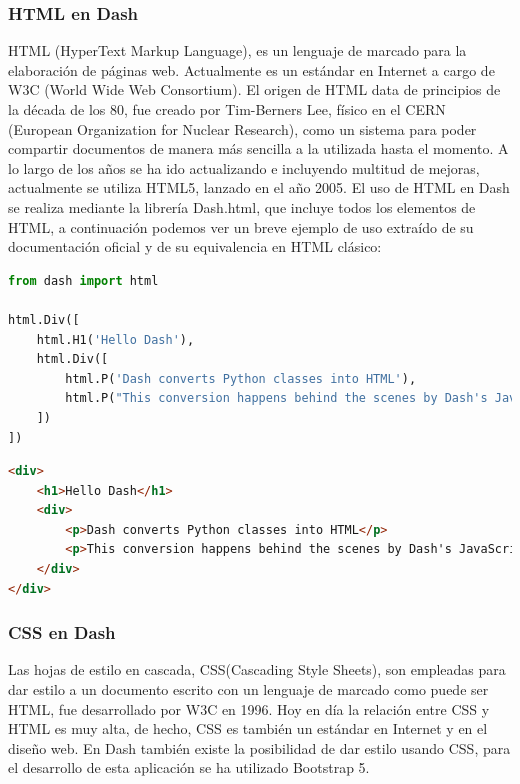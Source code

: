 \documentclass[a4paper, 12pt, oneside]{book}
\begin{document}
\subsubsection{HTML en Dash}
\label{subsubsec:html}
HTML (HyperText Markup Language), es un lenguaje de marcado para la elaboración de páginas web. Actualmente es un estándar en Internet a cargo de W3C (World Wide Web Consortium).
El origen de HTML data de principios de la década de los 80, fue creado por Tim-Berners Lee, físico en el CERN (European Organization for Nuclear Research), como un sistema para poder compartir documentos de manera más sencilla a la utilizada hasta el momento. A lo largo de los años se ha ido actualizando e incluyendo multitud de mejoras, actualmente se utiliza HTML5, lanzado en el año 2005.
El uso de HTML en Dash se realiza mediante la librería Dash.html, que incluye todos los elementos de HTML, a continuación podemos ver un breve ejemplo de uso extraído de su documentación oficial y de su equivalencia en HTML clásico:

\begin{lstlisting}[language=Python]
from dash import html

html.Div([
    html.H1('Hello Dash'),
    html.Div([
        html.P('Dash converts Python classes into HTML'),
        html.P("This conversion happens behind the scenes by Dash's JavaScript front-end")
    ])
])
\end{lstlisting}

\begin{lstlisting}[language=HTML]
<div>
    <h1>Hello Dash</h1>
    <div>
        <p>Dash converts Python classes into HTML</p>
        <p>This conversion happens behind the scenes by Dash's JavaScript front-end</p>
    </div>
</div>
\end{lstlisting}


\subsubsection{CSS en Dash}
\label{subsubsec:css}
Las hojas de estilo en cascada, CSS(Cascading Style Sheets), son empleadas para dar estilo a un documento escrito con un lenguaje de marcado como puede ser HTML, fue desarrollado por W3C en 1996. Hoy en día la relación entre CSS y HTML es muy alta, de hecho, CSS es también un estándar en Internet y en el diseño web. En Dash también existe la posibilidad de dar estilo usando CSS, para el desarrollo de esta aplicación se ha utilizado Bootstrap 5.
\end{document}
